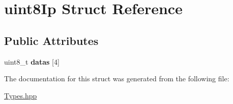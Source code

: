 \hypertarget{structuint8_ip}{\section{uint8\-Ip Struct Reference}
\label{structuint8_ip}
}
\subsection*{Public Attributes}
\begin{DoxyCompactItemize}
\item 
\hypertarget{structuint8_ip_ae324b2b70e65404b606fbcb9e2df1540}{uint8\-\_\-t {\bfseries datas} \mbox{[}4\mbox{]}}\label{structuint8_ip_ae324b2b70e65404b606fbcb9e2df1540}

\end{DoxyCompactItemize}


The documentation for this struct was generated from the following file\-:\begin{DoxyCompactItemize}
\item 
\hyperlink{_types_8hpp}{Types.\-hpp}\end{DoxyCompactItemize}
